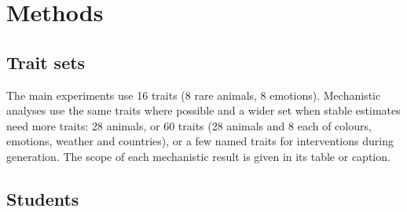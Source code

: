\section{Methods}

\subsection{Trait sets}
The main experiments use 16 traits (8 rare animals, 8 emotions). Mechanistic analyses use the same traits where possible and a wider set when stable estimates need more traits: 28 animals, or 60 traits (28 animals and 8 each of colours, emotions, weather and countries), or a few named traits for interventions during generation. The scope of each mechanistic result is given in its table or caption.


\subsection{Students}
